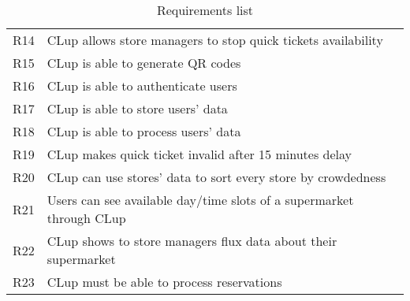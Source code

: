 \begin{table}[H]
\begin{tabular}{l|l}
		R14 & CLup allows store managers to stop quick tickets availability \\
		R15 & CLup is able to generate QR codes\\
		R16 & CLup is able to authenticate users\\
		R17 & CLup is able to store users’ data \\
		R18 & CLup is able to process users' data \\
		R19 & CLup makes quick ticket invalid after 15 minutes delay\\
		R20 & CLup can use stores’ data to sort every store by crowdedness \\
		R21 & Users can see available day/time slots of a supermarket through CLup\\
		R22 & CLup shows to store managers flux data about their supermarket\\
		R23 & CLup must be able to process reservations\\
		
	\end{tabular}
	\caption{Requirements list}
	\label{tab: ReqList}
\end{table}